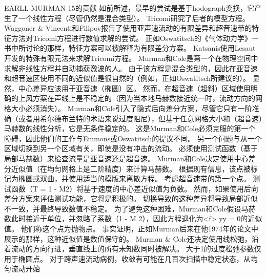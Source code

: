\documentclass[UTF8,11pt,a4paper,openany,fontset=fandol]{ctexbook}
\begin{document}
EARLL MURMAN 15的贡献 如前所述，最早的尝试是基于hodograph变换，它产生了一个线性方程（尽管仍然是混合类型）。 Tricomi研究了后者的模型方程。 Waggoner \& Vincenti和Filipov报告了使用亚声速流动的有限差异和超音速带的特征方法对Tricomi方程进行数值求解的尝试。 正如Oswatitsch的《气体动力学》一书中所讨论的那样，特征方案可以被解释为有限差分方案。 Katsanis使用Lesaut开发的特殊有限元法来求解Tricomi方程。 Murman和Cole是第一个在物理空间中求解非线性方程并自动捕获激波的人。 由于该方程是混合类型的，因此在亚音速和超音速区使用不同的近似值是很自然的（例如，正如Oswatitsch所建议的）。 显然，中心差异应该用于亚音速（椭圆）区。 然而，在超音速（超斜）区域使用明确的上风方案在声线上是不稳定的（因为当本地马赫数接近统一时，流动方向的网格大小必须消失）。 Murman和Cole引入了隐式后向差分方案，尽管它只有一阶准确（或者用希尔德布兰特的术语来说过度阻尼），但基于任意网格大小和（超音速）马赫数的线性分析，它是无条件稳定的。 这是Murman和Cole必须克服的第一个障碍，因此他们的工作与Emmons或Oswatitsch的提议不同。 另一个问题与从一个区域切换到另一个区域有关，即使是没有冲击的流动。 必须使用测试函数（基于局部马赫数）来检查流量是亚音速还是超音速。 Murman和Cole决定使用中心差分近似值（在均匀网格上是二阶精度）来计算马赫数。 根据现有信息，该点被标记为椭圆或双曲，并使用适当的模版来离散方程。 考虑超音速带的第一个点。 测试函数（T = 1 - M2）将基于速度的中心差近似值为负数。 然而，如果使用后向差分方案来评估测试功能，它将是积极的。 切换导致的这种差异将导致局部近似不一致，并最终导致数值不稳定。 为了避免这种困难，Murman和Cole假设马赫数此时接近于单位，并忽略了系数（1 - M 2），因此方程退化为<f> yy = 0的近似值。 他们称这个点为抛物点。 事实证明，正如Murman后来在他1974年的论文中展示的那样，这种近似值是数值保守的。 Murman \& Cole还决定使用线松弛，沿着流动的方向行进，垂直线上的所有未知数同时被解决。 大于1的过度松弛参数仅用于椭圆点。 对于跨声速流动病例，收敛有可能在几百次扫描中稳定状态，从均匀流动开始
\end{document}
